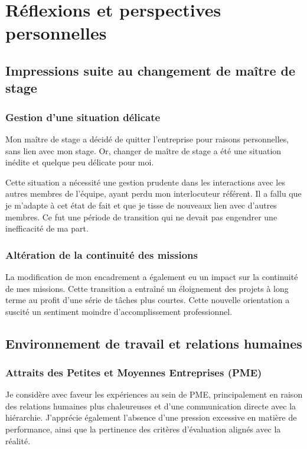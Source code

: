 \section{Réflexions et perspectives personnelles}
\subsection{Impressions suite au changement de maître de stage}
\subsubsection{Gestion d'une situation délicate}
Mon maître de stage a décidé de quitter l'entreprise pour raisons personnelles, sans lien avec mon stage.
Or, changer de maître de stage a été une situation inédite et quelque peu délicate pour moi.

Cette situation a nécessité une gestion prudente dans les interactions avec les autres membres de l'équipe, ayant perdu mon interlocuteur référent.
Il a fallu que je m'adapte à cet état de fait et que je tisse de nouveaux lien avec d'autres membres.
Ce fut une période de transition qui ne devait pas engendrer une inefficacité de ma part.

\subsubsection{Altération de la continuité des missions}
La modification de mon encadrement a également eu un impact sur la continuité de mes missions.
Cette transition a entraîné un éloignement des projets à long terme au profit d'une série de tâches plus courtes.
Cette nouvelle orientation a suscité un sentiment moindre d'accomplissement professionnel.


\subsection{Environnement de travail et relations humaines}
\subsubsection{Attraits des Petites et Moyennes Entreprises (PME)}
Je considère avec faveur les expériences au sein de PME, principalement en raison des relations humaines plus chaleureuses et d'une communication directe avec la hiérarchie.
J'apprécie également l'absence d'une pression excessive en matière de performance, ainsi que la pertinence des critères d'évaluation alignés avec la réalité.


